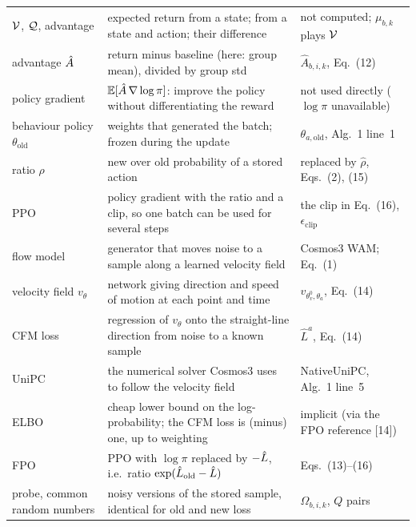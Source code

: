 \begin{center}
\begin{tabularx}{\linewidth}{@{}l Y >{\raggedright\arraybackslash}p{4.2cm}@{}}
$\mathcal{V}$, $\mathcal{Q}$, advantage & expected return from a state; from a state and action; their difference & not computed; $\mu_{b,k}$ plays $\mathcal{V}$\\
advantage $\hat A$ & return minus baseline (here: group mean), divided by group std & $\hat A_{b,i,k}$, Eq.~(12)\\
policy gradient & $\mathbb{E}[\hat A\,\nabla\log\pi]$: improve the policy without differentiating the reward & not used directly ($\log\pi$ unavailable)\\
behaviour policy $\theta_{\mathrm{old}}$ & weights that generated the batch; frozen during the update & $\theta_{a,\mathrm{old}}$, Alg.~1 line~1\\
ratio $\rho$ & new over old probability of a stored action & replaced by $\hat\rho$, Eqs.~(2), (15)\\
PPO & policy gradient with the ratio and a clip, so one batch can be used for several steps & the clip in Eq.~(16), $\epsilon_{\mathrm{clip}}$\\
flow model & generator that moves noise to a sample along a learned velocity field & Cosmos3 WAM; Eq.~(1)\\
velocity field $v_\theta$ & network giving direction and speed of motion at each point and time & $v_{\theta_v^0,\theta_a}$, Eq.~(14)\\
CFM loss & regression of $v_\theta$ onto the straight-line direction from noise to a known sample & $\hat L^a$, Eq.~(14)\\
UniPC & the numerical solver Cosmos3 uses to follow the velocity field & NativeUniPC, Alg.~1 line~5\\
ELBO & cheap lower bound on the log-probability; the CFM loss is (minus) one, up to weighting & implicit (via the FPO reference [14])\\
FPO & PPO with $\log\pi$ replaced by $-\hat L$, i.e.\ ratio $\exp(\hat L_{\mathrm{old}}-\hat L)$ & Eqs.~(13)--(16)\\
probe, common random numbers & noisy versions of the stored sample, identical for old and new loss & $\Omega_{b,i,k}$, $Q$ pairs\\
\bottomrule
\end{tabularx}
\end{center}

